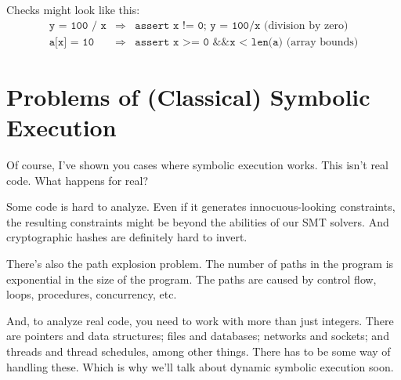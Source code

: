 \documentclass[11pt]{article}
\begin{document}
Checks might look like this:
\begin{eqnarray*}
 \texttt{y = 100 / x} &\Rightarrow& \texttt{assert x != 0; y = 100/x} \mbox{ (division by zero)}\\
 \texttt{a[x] = 10} &\Rightarrow& \texttt{assert x >= 0 \&\& x < len(a)} \mbox{ (array bounds)}
\end{eqnarray*}

\section*{Problems of (Classical) Symbolic Execution}
Of course, I've shown you cases where symbolic execution works. This isn't real code. What happens for real?

Some code is hard to analyze. Even if it generates innocuous-looking constraints, the resulting constraints might be beyond the abilities of our SMT solvers. And cryptographic hashes are definitely hard to invert.

There's also the path explosion problem. The number of paths in the program is exponential in the size of the program. The paths are caused by control flow, loops, procedures, concurrency, etc.

And, to analyze real code, you need to work with more than just integers.
There are pointers and data structures; files and databases; networks and sockets; and threads and thread schedules, among other things. There has to be some way of handling these. 
Which is why we'll talk about dynamic symbolic execution soon.




\end{document}
